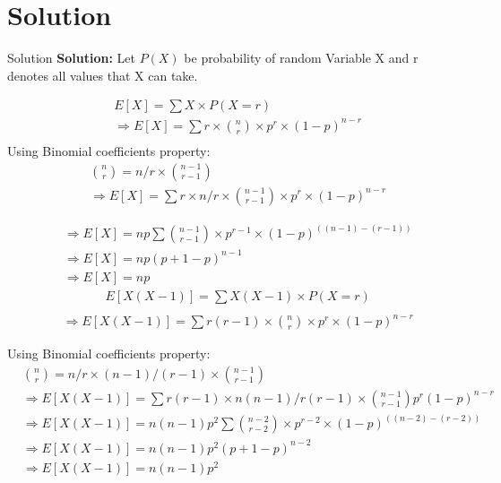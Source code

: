 \documentclass{beamer}
\begin{document}
	\section{Solution}
	\begin{frame}{Solution}
		\textbf{Solution:}
		Let $P(X)$ be probability of random Variable X and r denotes all values that X can take.
		
		\begin{align}
			&E[X]=\sum X\times P(X=r)\\
			&\Rightarrow E[X]=\sum r \times \binom{n}{r} \times p^{r} \times (1-p)^{n-r}\\
		\end{align}
		Using Binomial coefficients property:\\
		\begin{align}
			&\binom{n}{r}=n/r \times \binom{n-1}{r-1}\\
			&\Rightarrow E[X]=\sum r \times n/r \times \binom{n-1}{r-1} \times p^{r} \times (1-p)^{n-r}
		\end{align}
		
	\end{frame}
	\begin{frame}
		\begin{align}
			&\Rightarrow E[X]=np\sum \binom{n-1}{r-1} \times p^{r-1} \times (1-p)^{((n-1)-(r-1))}\\
			&\Rightarrow E[X]=np(p+1-p)^{n-1}\\
			&\Rightarrow E[X]=np
		\end{align}
		\begin{align}
			&E[X(X-1)]=\sum X(X-1)\times P(X=r)\\
		\end{align}
		\begin{align}
			&\Rightarrow E[X(X-1)]=\sum r(r-1)\times \binom{n}{r} \times p^{r} \times (1-p)^{n-r}
		\end{align}
		
		
	\end{frame}
	\begin{frame}
		Using Binomial coefficients property:\\
		\begin{align}
			&\binom{n}{r}=n/r \times (n-1)/(r-1) \times \binom{n-1}{r-1}\\
			&\Rightarrow E[X(X-1)]=\sum r(r-1) \times n(n-1)/r(r-1) \times \binom{n-1}{r-1}p^{r}(1-p)^{n-r}
		\end{align}
		\begin{align}
			&\Rightarrow E[X(X-1)]=n(n-1)p^{2}\sum \binom{n-2}{r-2} \times p^{r-2} \times (1-p)^{((n-2)-(r-2))}\\
			&\Rightarrow E[X(X-1)]=n(n-1)p^{2}(p+1-p)^{n-2}\\
			&\Rightarrow E[X(X-1)]=n(n-1)p^{2}
		\end{align}
	\end{frame}
\end{document}
